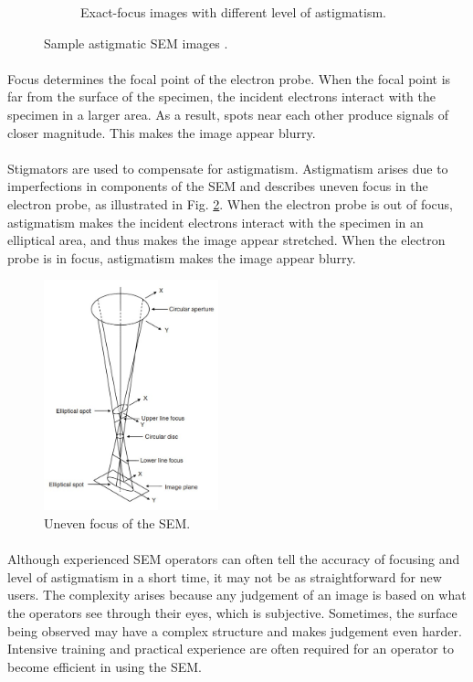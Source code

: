 \documentclass[12pt, twocolumn]{report}
\begin{document}
\begin{figure}[htbp]
\begin{subfigure}{0.45\textwidth}
        \caption{Exact-focus images with different level of astigmatism.}
    \end{subfigure}
    \caption{Sample astigmatic SEM images \cite{SEM astigmatism correction}.}
    \label{SEM sample images}
\end{figure}

\paragraph{}
Focus determines the focal point of the electron probe. When the focal point is far from the surface of the specimen, the incident electrons interact with the specimen in a larger area. As a result, spots near each other produce signals of closer magnitude. This makes the image appear blurry.

\paragraph{}
Stigmators are used to compensate for astigmatism. Astigmatism arises due to imperfections in components of the SEM and describes uneven focus in the electron probe, as illustrated in Fig. \ref{SEM uneven focus}. When the electron probe is out of focus, astigmatism makes the incident electrons interact with the specimen in an elliptical area, and thus makes the image appear stretched. When the electron probe is in focus, astigmatism makes the image appear blurry.

\begin{figure}[htbp]
    \centering
    \includegraphics[width=0.45\textwidth]{Figures/SEM uneven focus.jpg}
    \caption{Uneven focus of the SEM.}
    \label{SEM uneven focus}
\end{figure}

\paragraph{}
Although experienced SEM operators can often tell the accuracy of focusing and level of astigmatism in a short time, it may not be as straightforward for new users. The complexity arises because any judgement of an image is based on what the operators see through their eyes, which is subjective. Sometimes, the surface being observed may have a complex structure and makes judgement even harder. Intensive training and practical experience are often required for an operator to become efficient in using the SEM.
\end{document}
